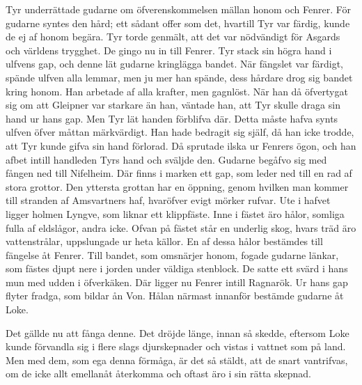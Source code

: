Tyr underrättade gudarne om öfverenskommelsen mällan honom och Fenrer.
För gudarne syntes den hård; ett sådant offer som det, hvartill Tyr var
färdig, kunde de ej af honom begära. Tyr torde genmält, att det var
nödvändigt för Asgards och världens trygghet. De gingo nu in till
Fenrer. Tyr stack sin högra hand i ulfvens gap, och denne lät gudarne
kringlägga bandet. När fängslet var färdigt, spände ulfven alla lemmar,
men ju mer han spände, dess hårdare drog sig bandet kring honom. Han
arbetade af alla krafter, men gagnlöst. När han då öfvertygat sig om att
Gleipner var starkare än han, väntade han, att Tyr skulle draga sin hand
ur hans gap. Men Tyr lät handen förblifva där. Detta måste hafva synts
ulfven öfver måttan märkvärdigt. Han hade bedragit sig själf, då han
icke trodde, att Tyr kunde gifva sin hand förlorad. Då sprutade ilska ur
Fenrers ögon, och han afbet intill handleden Tyrs hand och sväljde den.
Gudarne begåfvo sig med fången ned till Nifelheim. Där finns i marken
ett gap, som leder ned till en rad af stora grottor. Den yttersta
grottan har en öppning, genom hvilken man kommer till stranden af
Amsvartners haf, hvaröfver evigt mörker rufvar. Ute i hafvet ligger
holmen Lyngve, som liknar ett klippfäste. Inne i fästet äro hålor,
somliga fulla af eldslågor, andra icke. Ofvan på fästet står en underlig
skog, hvars träd äro vattenstrålar, uppslungade ur heta källor. En af
dessa hålor bestämdes till fängelse åt Fenrer. Till bandet, som
omsnärjer honom, fogade gudarne länkar, som fästes djupt nere i jorden
under väldiga stenblock. De satte ett svärd i hans mun med udden i
öfverkäken. Där ligger nu Fenrer intill Ragnarök. Ur hans gap flyter
fradga, som bildar ån Von. Hålan närmast innanför bestämde gudarne åt
Loke.

Det gällde nu att fånga denne. Det dröjde länge, innan
så skedde, eftersom Loke kunde förvandla sig i flere slags djurskepnader
och vistas i vattnet som på land. Men med dem, som ega denna förmåga, är
det så stäldt, att de snart vantrifvas, om de icke allt emellanåt
återkomma och oftast äro i sin rätta skepnad.

